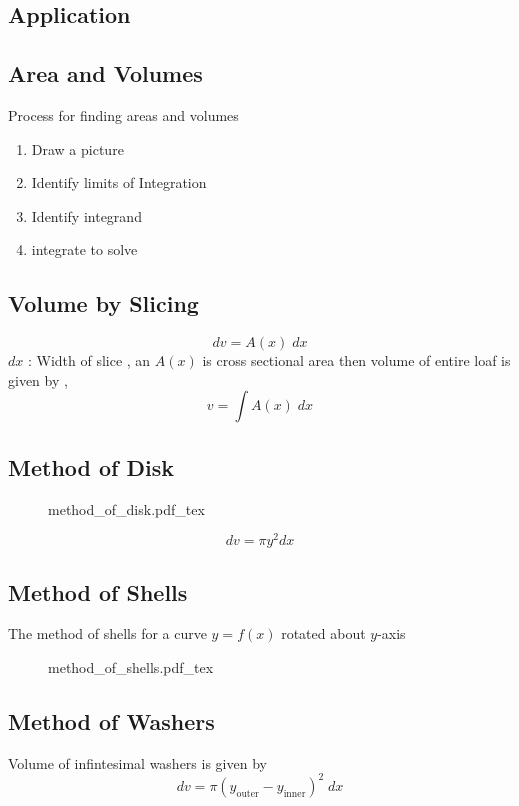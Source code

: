 \subsection{Application}

\subsection{Area  and Volumes}
Process for finding areas and volumes 
\begin{enumerate}
	\item Draw a picture
	\item Identify limits of Integration 
	\item Identify integrand
	\item integrate to solve
\end{enumerate}

\subsection{Volume by Slicing}
   \[
	dv = A(x) \; dx
   \]
   $dx$ : Width of slice , an $A(x)$ is cross sectional area
   then volume of entire loaf is given by , 
      \[
   	v = \int A(x) \; dx
      \]
\subsection{Method of Disk}
\begin{figure}[H]
	\centering
	\def\svgwidth{0.7\columnwidth}
	{method_of_disk.pdf_tex}
\end{figure}
   \[
	dv = \pi y^{2} dx
   \]
\subsection{Method of Shells }
The method of shells for a  curve $y=f(x)$ rotated about $y$-axis 
\begin{figure}[H]
	\centering
	\def\svgwidth{0.7\columnwidth}
	{method_of_shells.pdf_tex}
\end{figure}

\subsection{Method of Washers}
Volume of infintesimal washers is given by 
   \[
	dv = \pi (y_{\mathrm{outer}}-y_{\mathrm{inner}})^{2} \; dx
   \]
